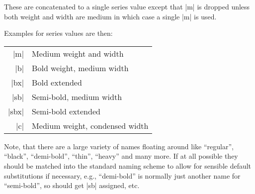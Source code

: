 \documentclass{ltxguide}[1995/11/28]
\begin{document}
These are concatenated to a single series value except that |m| is
dropped unless both weight and width are medium in which case a single
|m| is used.

\newpage

Examples for series values are then:
\begin{center}
\begin{minipage}{.7\linewidth}
   \begin{tabular}{rl}
      |m|    & Medium weight and width  \\
      |b|    & Bold weight, medium width  \\
      |bx|   & Bold extended \\
      |sb|   & Semi-bold, medium width\\
      |sbx|   & Semi-bold extended\\
      |c|    & Medium weight, condensed width
   \end{tabular}
\end{minipage}
\end{center}
Note, that there are a large variety of names floating around like
``regular'', ``black'', ``demi-bold'', ``thin'', ``heavy'' and many
more. If at all possible they should be matched into the standard
naming scheme to allow for sensible default substitutions if
necessary, e.g., ``demi-bold'' is normally just another name for
``semi-bold'', so should get |sb| assigned, etc.
\end{document}
